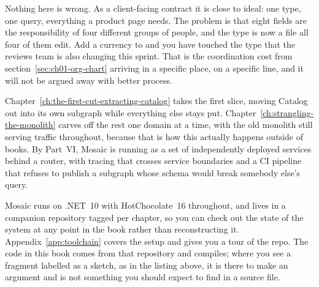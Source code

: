 Nothing here is wrong. As a client-facing contract it is close to ideal: one
type, one query, everything a product page needs. The problem is that eight
fields are the responsibility of four different groups of people, and the
 type is now a file all four of them edit. Add a currency to
 and you have touched the type that the reviews team is also
changing this sprint. That is the coordination cost from
section~\ref{sec:ch01-org-chart} arriving in a specific place, on a specific
line, and it will not be argued away with better process.

Chapter~\ref{ch:the-first-cut-extracting-catalog} takes the first slice,
moving Catalog out into its own subgraph while everything else stays put.
Chapter~\ref{ch:strangling-the-monolith} carves off the rest one domain at a
time, with the old monolith still serving traffic throughout, because that is
how this actually happens outside of books. By Part~VI, Mosaic is running as
a set of independently deployed services behind a router, with tracing that
crosses service boundaries and a CI pipeline that refuses to publish a
subgraph whose schema would break somebody else's query.

Mosaic runs on .NET~10 with HotChocolate~16 throughout, and lives in a
companion repository tagged per chapter, so you can check out the state of the
system at any point in the book rather than reconstructing it.
Appendix~\ref{app:toolchain} covers the setup and gives you a tour of the
repo. The code in this book comes
from that repository and compiles; where you see a fragment labelled as a
sketch, as in the listing above, it is there to make an argument and is not
something you should expect to find in a source file.
